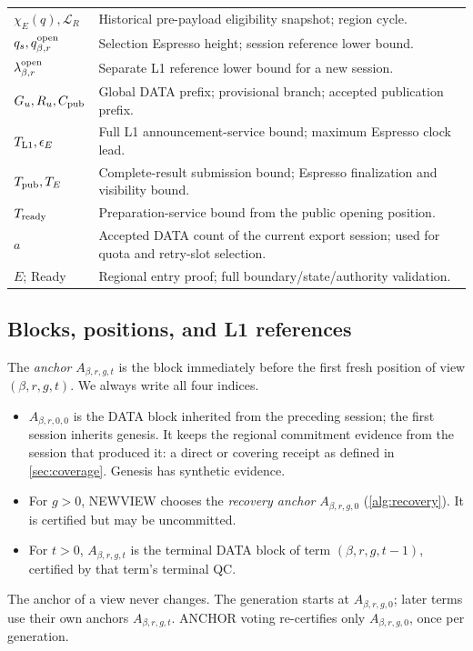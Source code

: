 \documentclass[11pt,a4paper]{article}
\newcommand{\defterm}[1]{\textcolor{rrBlue}{\textit{#1}}}
\begin{document}
\begin{table}[htbp]
\begin{tabularx}{\linewidth}{@{}p{.32\linewidth}Y@{}}
$\chi_E(q),\mathcal L_R$ & Historical pre-payload eligibility snapshot; region cycle.\\
$q_s,q_{\beta,r}^{\rm open}$ & Selection Espresso height; session reference lower bound.\\
$\lambda_{\beta,r}^{\rm open}$ & Separate L1 reference lower bound for a new session.\\
$G_u,R_u,C_{\rm pub}$ & Global DATA prefix; provisional branch; accepted publication prefix.\\
$T_{\rm L1},\epsilon_E$ & Full L1 announcement-service bound; maximum Espresso clock lead.\\
$T_{\rm pub},T_E$ & Complete-result submission bound; Espresso finalization and visibility bound.\\
$T_{\rm ready}$ & Preparation-service bound from the public opening position.\\
$a$ & Accepted DATA count of the current export session; used for quota and retry-slot selection.\\
$E$; Ready & Regional entry proof; full boundary/state/authority validation.\\
\bottomrule\end{tabularx}
\end{table}

\subsection{Blocks, positions, and L1 references}
\label{sec:blocks}
The \defterm{anchor} $A_{\beta,r,g,t}$ is the block immediately before the first fresh
position of view $(\beta,r,g,t)$. We always write all four indices.
\begin{itemize}
\item $A_{\beta,r,0,0}$ is the DATA block inherited from the preceding
session; the first session inherits genesis. It keeps the regional commitment evidence from the session that
produced it: a direct or covering receipt as defined in
\cref{sec:coverage}. Genesis has synthetic evidence.
\item For $g>0$, NEWVIEW chooses the \defterm{recovery anchor} $A_{\beta,r,g,0}$
(\cref{alg:recovery}). It is certified but may be uncommitted.
\item For $t>0$, $A_{\beta,r,g,t}$ is the terminal DATA block of term
$(\beta,r,g,t-1)$, certified by that term's terminal QC.
\end{itemize}
The anchor of a view never changes. The generation starts at
$A_{\beta,r,g,0}$; later terms use their own anchors $A_{\beta,r,g,t}$. ANCHOR voting
re-certifies only $A_{\beta,r,g,0}$, once per generation.
\end{document}
